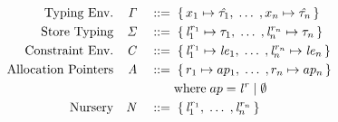 \begin{displaymath}
  \begin{aligned}
    \textup{Typing Env.} && \mathit{\Gamma} && \; ::= \; & \; \{ \, x_1 \mapsto \mathit{\hat{\tau}}_1, \; \ldots \; , x_n \mapsto \mathit{\hat{\tau}}_n \,\} \\
    \textup{Store Typing} && \mathit{\Sigma} && \; ::= \; & \; \{ \, {\mathit{l}}^{r_1}_1 \mapsto \mathit{\tau}_1, \; \ldots \; , {\mathit{l}}^{r_n}_n \mapsto \mathit{\tau}_n \,\} \\      
    \textup{Constraint Env.} && \mathit{C} && \; ::= \; & \;
      \{ \, {\mathit{l}}^{r_1}_1 \mapsto \mathit{le}_1, \; \ldots \; , {\mathit{l}}^{r_n}_n \mapsto \mathit{le}_n \,\} \\
    \textup{Allocation Pointers} && \mathit{A} && \; ::= \; & \; \{ \, r_1 \mapsto ap_1, \; \ldots \; , r_n \mapsto ap_n \,\} \\
    && && & {\text{where} \; ap = {\mathit{l}}^{\mathit{r}} \; | \; \emptyset} \\
    \textup{Nursery} && \mathit{N} && \; ::= \; & \; \{ \, {\mathit{l}}^{r_1}_1, \; \ldots \; , {\mathit{l}}^{r_n}_n \,\}
  \end{aligned}
\end{displaymath}
